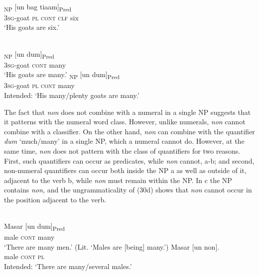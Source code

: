 \ea%
\label{ex:9:27}
 \\
\textsubscript{NP} [{un} bag {tiaam}]\textsubscript{Pred} \\
    \textsc{3sg}-goat \textsc{pl} \textsc{cont} \textsc{clf} six \\
\glt `His goats are six.'
\z







\ea%
\label{ex:9:28}
 \\
\ea
\gll [{Ga-qavif}] \textsubscript{NP} [un dum]\textsubscript{Pred}  \\
 \textsc{3sg}-goat \textsc{cont} many   \\
\glt `His goats are many.'
\ex
{}\textsubscript{NP} [un dum]\textsubscript{Pred}  \\
    \textsc{3sg}-goat \textsc{pl} \textsc{cont} many\\
\glt Intended: `His many/plenty goats are many.'
\z
\z






The fact that \textit{non} does not combine with a numeral in a single NP suggests that it patterns with the numeral word class. However, unlike numerals, \textit{non} cannot combine with a classifier. On the other hand, \textit{non} can combine with the quantifier \textit{dum} `much/many' in a single NP, which a numeral cannot do. However, at the same time, \textit{non} does not pattern with the class of quantifiers for two reasons. First, such quantifiers can occur as predicates, while \textit{non} cannot, a-b; and second, non-numeral quantifiers can occur both inside the NP a as well as outside of it, adjacent to the verb b, while \textit{non} must remain within the NP. In c the NP contains \textit{non,} and the ungrammaticality of (30d) shows that \textit{non} cannot occur in the position adjacent to the verb.


\ea%
\label{ex:9:29}
 \\
\ea
\gll Masar [un dum]\textsubscript{Pred} \\
    male \textsc{cont} many \\
\glt  `There are many men.' (Lit. `Males are [being] many.')
\ex
\gll *Masar [un non]{.} \\
   male \textsc{cont} \textsc{pl}  \\
\glt  Intended: `There are many/several males.'
\z
\z







